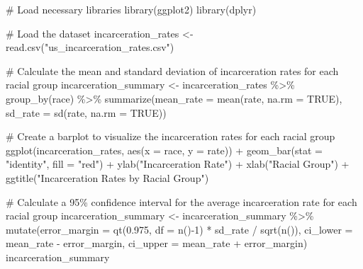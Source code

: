 \documentclass[
  letterpaper,
  DIV=11,
  numbers=noendperiod]{scrreprt}
\newenvironment{Shaded}{\begin{snugshade}}{\end{snugshade}}
\newcommand{\AttributeTok}[1]{\textcolor[rgb]{0.40,0.45,0.13}{#1}}
\newcommand{\CommentTok}[1]{\textcolor[rgb]{0.37,0.37,0.37}{#1}}
\newcommand{\ConstantTok}[1]{\textcolor[rgb]{0.56,0.35,0.01}{#1}}
\newcommand{\DecValTok}[1]{\textcolor[rgb]{0.68,0.00,0.00}{#1}}
\newcommand{\FloatTok}[1]{\textcolor[rgb]{0.68,0.00,0.00}{#1}}
\newcommand{\FunctionTok}[1]{\textcolor[rgb]{0.28,0.35,0.67}{#1}}
\newcommand{\NormalTok}[1]{\textcolor[rgb]{0.00,0.23,0.31}{#1}}
\newcommand{\OtherTok}[1]{\textcolor[rgb]{0.00,0.23,0.31}{#1}}
\newcommand{\SpecialCharTok}[1]{\textcolor[rgb]{0.37,0.37,0.37}{#1}}
\newcommand{\StringTok}[1]{\textcolor[rgb]{0.13,0.47,0.30}{#1}}
\begin{document}

\begin{Shaded}
\begin{Highlighting}[]
\CommentTok{\# Load necessary libraries}
\FunctionTok{library}\NormalTok{(ggplot2)}
\FunctionTok{library}\NormalTok{(dplyr)}

\CommentTok{\# Load the dataset}
\NormalTok{incarceration\_rates }\OtherTok{\textless{}{-}} \FunctionTok{read.csv}\NormalTok{(}\StringTok{"us\_incarceration\_rates.csv"}\NormalTok{)}

\CommentTok{\# Calculate the mean and standard deviation of incarceration rates for each racial group}
\NormalTok{incarceration\_summary }\OtherTok{\textless{}{-}}\NormalTok{ incarceration\_rates }\SpecialCharTok{\%\textgreater{}\%}
  \FunctionTok{group\_by}\NormalTok{(race) }\SpecialCharTok{\%\textgreater{}\%}
  \FunctionTok{summarize}\NormalTok{(}\AttributeTok{mean\_rate =} \FunctionTok{mean}\NormalTok{(rate, }\AttributeTok{na.rm =} \ConstantTok{TRUE}\NormalTok{),}
            \AttributeTok{sd\_rate =} \FunctionTok{sd}\NormalTok{(rate, }\AttributeTok{na.rm =} \ConstantTok{TRUE}\NormalTok{))}

\CommentTok{\# Create a barplot to visualize the incarceration rates for each racial group}
\FunctionTok{ggplot}\NormalTok{(incarceration\_rates, }\FunctionTok{aes}\NormalTok{(}\AttributeTok{x =}\NormalTok{ race, }\AttributeTok{y =}\NormalTok{ rate)) }\SpecialCharTok{+}
  \FunctionTok{geom\_bar}\NormalTok{(}\AttributeTok{stat =} \StringTok{"identity"}\NormalTok{, }\AttributeTok{fill =} \StringTok{"red"}\NormalTok{) }\SpecialCharTok{+}
  \FunctionTok{ylab}\NormalTok{(}\StringTok{"Incarceration Rate"}\NormalTok{) }\SpecialCharTok{+} \FunctionTok{xlab}\NormalTok{(}\StringTok{"Racial Group"}\NormalTok{) }\SpecialCharTok{+} 
  \FunctionTok{ggtitle}\NormalTok{(}\StringTok{"Incarceration Rates by Racial Group"}\NormalTok{)}

\CommentTok{\# Calculate a 95\% confidence interval for the average incarceration rate for each racial group}
\NormalTok{incarceration\_summary }\OtherTok{\textless{}{-}}\NormalTok{ incarceration\_summary }\SpecialCharTok{\%\textgreater{}\%}
  \FunctionTok{mutate}\NormalTok{(}\AttributeTok{error\_margin =} \FunctionTok{qt}\NormalTok{(}\FloatTok{0.975}\NormalTok{, }\AttributeTok{df =} \FunctionTok{n}\NormalTok{()}\SpecialCharTok{{-}}\DecValTok{1}\NormalTok{) }\SpecialCharTok{*}\NormalTok{ sd\_rate }\SpecialCharTok{/} \FunctionTok{sqrt}\NormalTok{(}\FunctionTok{n}\NormalTok{()),}
         \AttributeTok{ci\_lower =}\NormalTok{ mean\_rate }\SpecialCharTok{{-}}\NormalTok{ error\_margin,}
         \AttributeTok{ci\_upper =}\NormalTok{ mean\_rate }\SpecialCharTok{+}\NormalTok{ error\_margin)}
\NormalTok{incarceration\_summary}
\end{Highlighting}
\end{Shaded}
\end{document}
